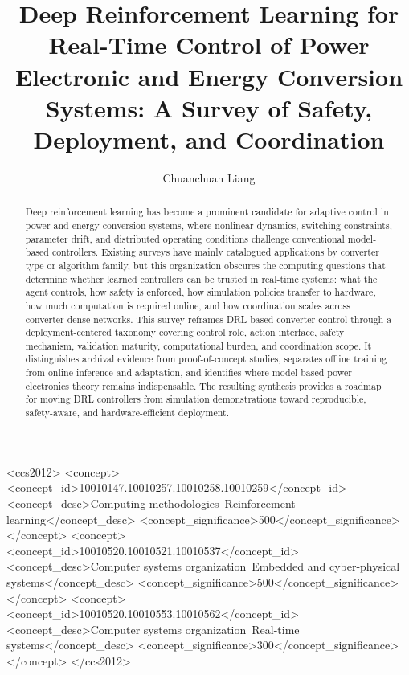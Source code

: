 \documentclass[manuscript,screen,review]{acmart}
\begin{document}
\title[DRL for Real-Time Control of Power Electronic and Energy Conversion Systems]{Deep Reinforcement Learning for Real-Time Control of Power Electronic and Energy Conversion Systems: A Survey of Safety, Deployment, and Coordination}

\author{Chuanchuan Liang}

\begin{abstract}
Deep reinforcement learning has become a prominent candidate for adaptive control in power and energy conversion systems, where nonlinear dynamics, switching constraints, parameter drift, and distributed operating conditions challenge conventional model-based controllers.
Existing surveys have mainly catalogued applications by converter type or algorithm family, but this organization obscures the computing questions that determine whether learned controllers can be trusted in real-time systems: what the agent controls, how safety is enforced, how simulation policies transfer to hardware, how much computation is required online, and how coordination scales across converter-dense networks.
This survey reframes DRL-based converter control through a deployment-centered taxonomy covering control role, action interface, safety mechanism, validation maturity, computational burden, and coordination scope.
It distinguishes archival evidence from proof-of-concept studies, separates offline training from online inference and adaptation, and identifies where model-based power-electronics theory remains indispensable.
The resulting synthesis provides a roadmap for moving DRL controllers from simulation demonstrations toward reproducible, safety-aware, and hardware-efficient deployment.
\end{abstract}

\begin{CCSXML}
<ccs2012>
 <concept>
  <concept_id>10010147.10010257.10010258.10010259</concept_id>
  <concept_desc>Computing methodologies~Reinforcement learning</concept_desc>
  <concept_significance>500</concept_significance>
 </concept>
 <concept>
  <concept_id>10010520.10010521.10010537</concept_id>
  <concept_desc>Computer systems organization~Embedded and cyber-physical systems</concept_desc>
  <concept_significance>500</concept_significance>
 </concept>
 <concept>
  <concept_id>10010520.10010553.10010562</concept_id>
  <concept_desc>Computer systems organization~Real-time systems</concept_desc>
  <concept_significance>300</concept_significance>
 </concept>
</ccs2012>
\end{CCSXML}
\end{document}
